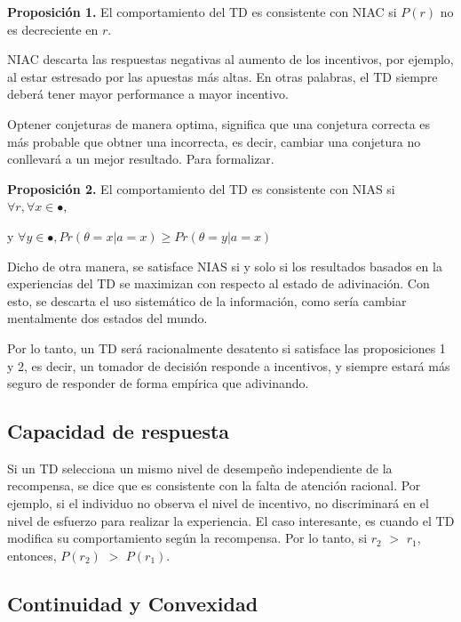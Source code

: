 \documentclass[11pt,letterpaper]{article}
\begin{document}
\vspace{0.5cm}

\textbf{Proposición 1.} El comportamiento del TD es consistente con NIAC si $P(r)$ no es decreciente en $r$.

\vspace{0,5cm}

NIAC descarta las respuestas negativas al aumento de los incentivos, por ejemplo, al estar estresado por las apuestas más altas. En otras palabras, el TD siempre deberá tener mayor performance a mayor incentivo.

Optener conjeturas de manera optima, significa que una conjetura correcta es más probable que obtner una incorrecta, es decir, cambiar una conjetura no conllevará a un mejor resultado. Para formalizar.

\vspace{0,5cm}

\textbf{Proposición 2.} El comportamiento del TD es consistente con NIAS si $\forall r, \forall x \in \bullet$,


y $\forall y \in \bullet, Pr(\theta=x| a=x)\geq Pr(\theta=y | a=x)$

\vspace{0,5cm}

Dicho de otra manera, se satisface NIAS si y solo si los resultados basados en la experiencias del TD se maximizan con respecto al estado de adivinación. Con esto, se descarta el uso sistemático de la información, como sería cambiar mentalmente dos estados del mundo. 

Por lo tanto, un TD será racionalmente desatento si satisface las proposiciones 1 y 2, es decir, un tomador de decisión responde a incentivos, y siempre estará más seguro de responder de forma empírica que adivinando.

\subsection{Capacidad de respuesta}

Si un TD selecciona un mismo nivel de desempeño independiente de la recompensa, se dice que es consistente con la falta de atención racional. Por ejemplo, si el individuo no observa el nivel de incentivo, no discriminará en el nivel de esfuerzo para realizar la experiencia. El caso interesante, es cuando el TD modifica su comportamiento según la recompensa.
Por lo tanto, si $r_2$ $>$ $r_1$, entonces, $P(r_2)$ $>$ $P(r_1)$.

\subsection{Continuidad y Convexidad}
\end{document}
